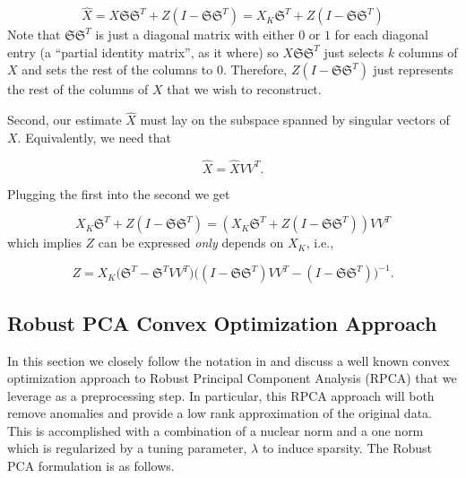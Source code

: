\documentclass[conference]{IEEEtran}
\begin{document}
$$
\hat{X} = X \mathfrak{S} \mathfrak{S}^T + Z (I-\mathfrak{S} \mathfrak{S}^T) = X_K \mathfrak{S}^T + Z (I-\mathfrak{S} \mathfrak{S}^T)
$$
\noindent  Note that $\mathfrak{S} \mathfrak{S}^T$ is just a diagonal matrix with either $0$ or $1$ for each diagonal entry (a ``partial identity matrix'', as it where) so $X \mathfrak{S} \mathfrak{S}^T$ just selects $k$ columns of $X$ and sets the rest of the columns to $0$.  Therefore, $Z (I-\mathfrak{S} \mathfrak{S}^T)$ just represents the rest of the columns of $X$ that we wish to reconstruct.

Second, our estimate $\hat{X}$ must lay on the subspace spanned by singular vectors of $X$.  Equivalently, we need that

$$
\hat{X} = \hat{X} V V^T.
$$

\noindent Plugging the first into the second we get

$$
X_K \mathfrak{S}^T + Z (I-\mathfrak{S} \mathfrak{S}^T) = (X_K \mathfrak{S}^T + Z (I-\mathfrak{S} \mathfrak{S}^T)) V V^T 
$$
which implies $Z$ can be expressed \emph{only} depends on $X_K$, i.e.,

$$Z= X_K \bigg(\mathfrak{S}^T - \mathfrak{S}^T V V^T\bigg) \bigg((I-\mathfrak{S} \mathfrak{S}^T)V V^T - (I-\mathfrak{S} \mathfrak{S}^T)\bigg)^{-1}.$$ 
%
%
%
%
%


\subsection{Robust PCA Convex Optimization Approach}

In this section we closely follow the notation in \cite{Paffenroth2012a,Paffenroth2013b,paffenroth2018robust}
and discuss a well known convex optimization approach to Robust Principal Component Analysis (RPCA) that we leverage as a preprocessing step.
In particular, this RPCA approach will both remove anomalies and provide a low rank approximation of the original data. This is accomplished with a combination of a nuclear norm and a one norm which is regularized by a tuning parameter, $\lambda$ to induce sparsity. The Robust PCA formulation is as follows.
\end{document}
